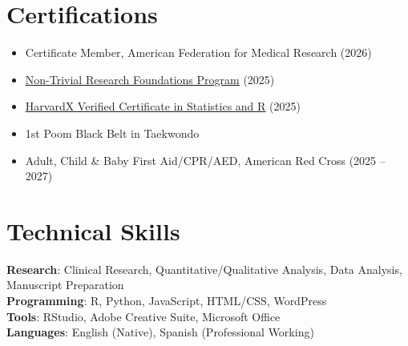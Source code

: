 \documentclass[letterpaper,11pt]{article}
\newcommand{\resumeItem}[1]{
  \item\small{
    {#1 \vspace{-2pt}}
  }
}
\newcommand{\resumeSubHeadingListStart}{\begin{itemize}[leftmargin=0.15in, label={}]}
\newcommand{\resumeSubHeadingListEnd}{\end{itemize}}
\newcommand{\resumeItemListStart}{\begin{itemize}}
\newcommand{\resumeItemListEnd}{\end{itemize}\vspace{-5pt}}
\begin{document}
\section{Certifications}
  \resumeSubHeadingListStart
  \resumeItemListStart
    \resumeItem{Certificate Member, American Federation for Medical Research (2026)}
    \resumeItem{\href{https://credsverse.com/credentials/2fb3b952-2741-46f3-8659-fef7872c36ff}{\underline{Non-Trivial Research Foundations Program}} (2025)}
    \resumeItem{\href{https://courses.edx.org/certificates/8b2736ee4f9c4323bb64f5355342e3a9}{\underline{HarvardX Verified Certificate in Statistics and R}} (2025)}
    \resumeItem{1st Poom Black Belt in Taekwondo}
    \resumeItem{Adult, Child \& Baby First Aid/CPR/AED, American Red Cross (2025 -- 2027)}
  \resumeItemListEnd
  \resumeSubHeadingListEnd

\section{Technical Skills}
 \begin{itemize}[leftmargin=0.15in, label={}]
    \small{\item{
     \textbf{Research}{: Clinical Research, Quantitative/Qualitative Analysis, Data Analysis, Manuscript Preparation} \\
     \textbf{Programming}{: R, Python, JavaScript, HTML/CSS, WordPress} \\
     \textbf{Tools}{: RStudio, Adobe Creative Suite, Microsoft Office} \\
     \textbf{Languages}{: English (Native), Spanish (Professional Working)}
    }}
 \end{itemize}

\end{document}
